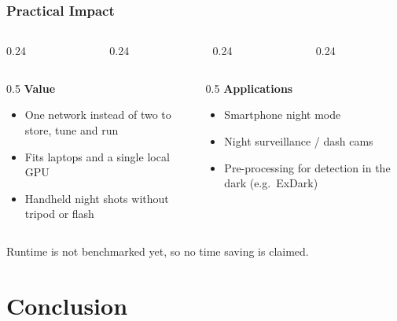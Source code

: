 ﻿\documentclass[
    11pt,%
    aspectratio=169,%
]{beamer}
\begin{document}
\begin{frame}
    \frametitle{Practical Impact}

    \begin{columns}[t]
        \begin{column}{0.24\textwidth}\end{column}
        \begin{column}{0.24\textwidth}\end{column}
        \begin{column}{0.24\textwidth}\end{column}
        \begin{column}{0.24\textwidth}\end{column}
    \end{columns}
    \vspace{2mm}
    \begin{columns}[t]
        \begin{column}{0.5\textwidth}
            \small
            \textbf{Value}
            \begin{itemize}
                \item One network instead of two to store, tune and run
                \item Fits laptops and a single local GPU
                \item Handheld night shots without tripod or flash
            \end{itemize}
        \end{column}
        \begin{column}{0.5\textwidth}
            \small
            \textbf{Applications}
            \begin{itemize}
                \item Smartphone night mode
                \item Night surveillance / dash cams
                \item Pre-processing for detection in the dark (e.g.\ ExDark)
            \end{itemize}
        \end{column}
    \end{columns}
    {\tiny Runtime is not benchmarked yet, so no time saving is claimed.}
\end{frame}
\section{Conclusion}
\end{document}
